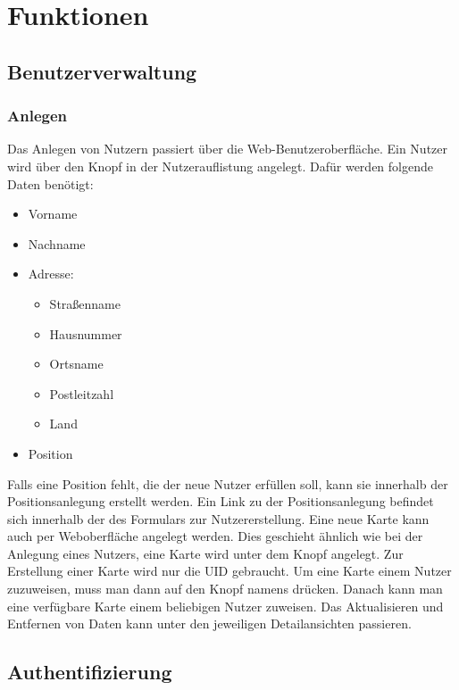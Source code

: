 \documentclass[../main.tex]{subfiles}
\begin{document}
\section{Funktionen}

\subsection{Benutzerverwaltung}

\subsubsection{Anlegen}
Das Anlegen von Nutzern passiert über die Web-Benutzeroberfläche. Ein Nutzer wird über den Knopf  in der Nutzerauflistung angelegt. Dafür werden folgende Daten benötigt: 

\begin{itemize}
  \item Vorname
  \item Nachname
  \item Adresse:
  \begin{itemize}
      \item Straßenname
      \item Hausnummer
      \item Ortsname
      \item Postleitzahl
      \item Land
  \end{itemize}
  \item Position
\end{itemize}

\noindent Falls eine Position fehlt, die der neue Nutzer erfüllen soll, kann sie innerhalb der Positionsanlegung erstellt werden. Ein Link zu der Positionsanlegung befindet sich innerhalb der des Formulars zur Nutzererstellung.
Eine neue Karte kann auch per Weboberfläche angelegt werden. Dies geschieht ähnlich wie bei der Anlegung eines Nutzers, eine Karte wird unter dem Knopf  angelegt. Zur Erstellung einer Karte wird nur die UID gebraucht. Um eine Karte einem Nutzer zuzuweisen, muss man dann auf den Knopf namens  drücken. Danach kann man eine verfügbare Karte einem beliebigen Nutzer zuweisen.
Das Aktualisieren und Entfernen von Daten kann unter den jeweiligen Detailansichten passieren.

\subsection{Authentifizierung}
\end{document}
